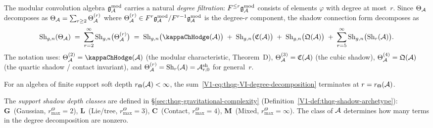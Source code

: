 \begin{remark}
The modular convolution algebra $\mathfrak{g}_{\mathcal{A}}^{\mathrm{mod}}$ carries a natural
\emph{degree filtration}: $F^{\leq r}\mathfrak{g}_{\mathcal{A}}^{\mathrm{mod}}$ consists of elements
$\varphi$ with degree at most~$r$. Since $\Theta_{\mathcal{A}}$ decomposes
as $\Theta_{\mathcal{A}} = \sum_{r \geq 2} \Theta_{\mathcal{A}}^{(r)}$ where
$\Theta_{\mathcal{A}}^{(r)} \in F^r\mathfrak{g}_{\mathcal{A}}^{\mathrm{mod}} / F^{r-1}\mathfrak{g}_{\mathcal{A}}^{\mathrm{mod}}$ is the degree-$r$
component, the shadow connection form decomposes as
\begin{equation}%
\Sh_{g,n}(\Theta_\cA)
\;=\;
\sum_{r=2}^{\infty}
\Sh_{g,n}\bigl(\Theta_\cA^{(r)}\bigr)
\;=\;
\Sh_{g,n}\bigl(\kappaChHodge(\cA)\bigr)
\;+\;
\Sh_{g,n}\bigl(\mathfrak{C}(\cA)\bigr)
\;+\;
\Sh_{g,n}\bigl(\mathfrak{Q}(\cA)\bigr)
\;+\;
\sum_{r=5}^{\infty}\Sh_{g,n}\bigl(\Sh_r(\cA)\bigr).
\end{equation}
The notation uses:
$\Theta_\cA^{(2)} = \kappaChHodge(\cA)$ (the modular characteristic,
Theorem~D),
$\Theta_{\mathcal{A}}^{(3)} = \mathfrak{C}(\mathcal{A})$ (the cubic shadow),
$\Theta_{\mathcal{A}}^{(4)} = \mathfrak{Q}(\mathcal{A})$ (the quartic shadow /
contact invariant), and
$\Theta_{\mathcal{A}}^{(r)} = \operatorname{Sh}_r(\mathcal{A}) = \mathcal{A}^{\mathrm{sh}}_{r,0}$
for general~$r$.

For an algebra of finite support soft depth \(r_\Theta(\mathcal{A})<\infty\),
the sum~\eqref{V1-eq:thqg-VI-degree-decomposition} terminates at
\(r=r_\Theta(\mathcal{A})\).

The \emph{support shadow depth classes} are defined in
\S\ref{sec:thqg-gravitational-complexity}
(Definition~\ref{V1-def:thqg-shadow-archetype}):
\textbf{G}~(Gaussian, \(r^\Theta_{\max}=2\)),
\textbf{L}~(Lie/tree, \(r^\Theta_{\max}=3\)),
\textbf{C}~(Contact, \(r^\Theta_{\max}=4\)),
\textbf{M}~(Mixed, \(r^\Theta_{\max}=\infty\)).
The class of $\mathcal{A}$ determines how many terms in the
degree decomposition are nonzero.
\end{remark}

